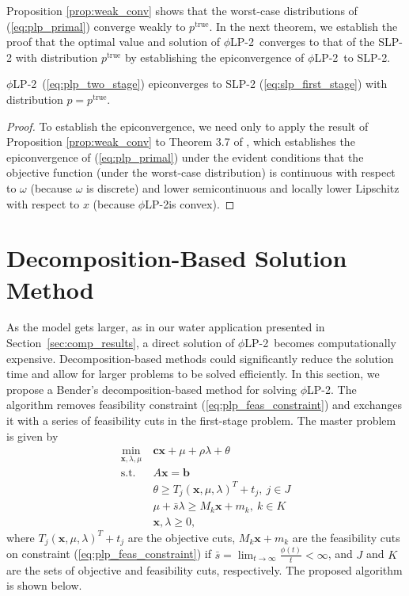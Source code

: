 \documentclass[ijoc,letterpaper]{informs3} %
\newcommand{\x}{\mathbf{x}}
\renewcommand{\c}{\mathbf{c}}
\renewcommand{\b}{\mathbf{b}}
\newcommand{\ptrue}{p^{\text{true}}}
\newcommand{\st}{\mbox{s.t.}}
\newcommand{\plp}{$\phi$LP-2}
\begin{document}
Proposition \ref{prop:weak_conv} shows that the worst-case distributions of (\ref{eq:plp_primal}) converge weakly to $\ptrue$.
In the next theorem, we establish the proof that the optimal value and solution of \plp\ converges to that of the SLP-2 with distribution $\ptrue$ by establishing the epiconvergence of \plp\ to SLP-2.
\begin{theorem}
	\plp\ (\ref{eq:plp_two_stage}) epiconverges to SLP-2 (\ref{eq:slp_first_stage}) with distribution $p = \ptrue$.
\end{theorem}

\begin{proof}
	To establish the epiconvergence, we need only to apply the result of Proposition \ref{prop:weak_conv} to Theorem 3.7 of \cite{dupacova1988asymptotic}, which establishes the epiconvergence of (\ref{eq:plp_primal}) under the evident conditions that the objective function (under the worst-case distribution) is continuous with respect to $\omega$ (because $\omega$ is discrete) and lower semicontinuous and locally lower Lipschitz with respect to $x$ (because \plp is convex).
\end{proof}

\section{Decomposition-Based Solution Method}
\label{sec:soln_algorithm}

As the model gets larger, as in our water application presented in Section~\ref{sec:comp_results}, a direct solution of \plp\ becomes computationally expensive. 
Decomposition-based methods could significantly reduce the solution time and allow for larger problems to be solved efficiently. In this section, we propose a Bender's decomposition-based method for solving \plp.
The algorithm removes feasibility constraint (\ref{eq:plp_feas_constraint})  and exchanges it with a series of feasibility cuts in the first-stage problem.
The master problem is given by
\begin{align}
	\min_{\x,\lambda,\mu} \ & \c\x + \mu + \rho \lambda + \theta \label{eq:master_problem}\\
	\st \ & A\x = \b \nonumber \\
	& \theta \geq T_j (\x,\mu,\lambda)^T + t_j, \ j \in J \nonumber \\
	& \mu + \bar{s}\lambda \geq M_k \x + m_k, \ k \in K \nonumber \\
	& \x,\lambda \geq 0, \nonumber
\end{align}
where $T_j (\x,\mu,\lambda)^T + t_j$ are the objective cuts, $M_k \x + m_k$ are the feasibility cuts on constraint (\ref{eq:plp_feas_constraint}) if $\bar{s} = \lim_{t \rightarrow \infty} \frac{\phi(t)}{t} < \infty$, and $J$ and $K$ are the sets of objective and feasibility cuts, respectively.
The proposed algorithm is shown below.
\end{document}
